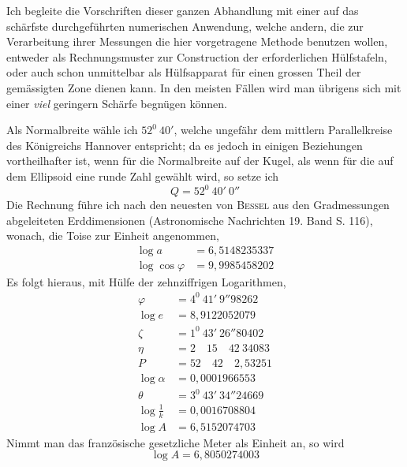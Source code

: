 \indent Ich begleite die Vorschriften dieser ganzen Abhandlung mit einer auf das schärfste durchgeführten numerischen Anwendung, welche andern, die zur Verarbeitung ihrer Messungen die hier vorgetragene Methode benutzen wollen, entweder als Rechnungsmuster zur Construction der erforderlichen Hülfstafeln, oder auch schon unmittelbar als Hülfsapparat für einen grossen Theil der gemässigten Zone dienen kann. In den meisten Fällen wird man übrigens sich mit einer \textit{viel} geringern Schärfe begnügen können.

Als Normalbreite wähle ich \(52^0\ 40'\), welche ungefähr dem mittlern Parallelkreise des Königreichs Hannover entspricht; da es jedoch in einigen Beziehungen vortheilhafter ist, wenn für die Normalbreite auf der Kugel, als wenn für die auf dem Ellipsoid eine runde Zahl gewählt wird, so setze ich
\[
Q=52^0\ 40'\ 0''
\]
\indent Die Rechnung führe ich nach den neuesten von \textsc{Bessel} aus den Gradmessungen abgeleiteten Erddimensionen (Astronomische Nachrichten 19. Band S. 116), wonach, die Toise zur Einheit angenommen,
\[
\begin{aligned}
\log a&=6{,}5148235337\\
\log\cos\varphi&=9{,}9985458202
\end{aligned}
\]
Es folgt hieraus, mit Hülfe der zehnziffrigen Logarithmen,
\[
\begin{aligned}
\varphi&=4^0\ 41'\ 9''98262\\
\log e&=8{,}9122052079\\
\zeta&=1^0\ 43'\ 26''80402\\
\eta&=2\quad15\quad42\ 34083\\
P&=52\quad42\quad2{,}53251\\
\log\alpha&=0{,}0001966553\\
\theta&=3^0\ 43'\ 34''24669\\
\log\frac{1}{k}&=0{,}0016708804\\
\log A&=6{,}5152074703
\end{aligned}
\]
Nimmt man das französische gesetzliche Meter als Einheit an, so wird
\[
\log A=6{,}8050274003
\]
